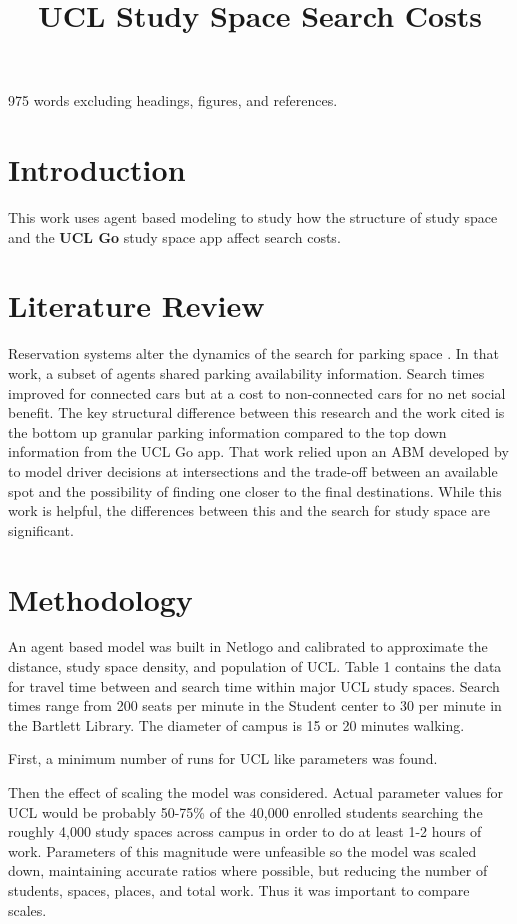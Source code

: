 \documentclass[11pt]{article} %
\title{\vspace{-2.0cm}UCL Study Space Search Costs}
\begin{document}
\maketitle

975 words excluding headings, figures, and references. \\

\section{Introduction}

This work uses agent based modeling to study how the structure of study space and the \textbf{UCL Go} study space app affect search costs.

\section{Literature Review}

Reservation systems alter the dynamics of the search for parking space \parencite{TasseronG.2017Upsr}. In that work, a subset of agents shared parking availability information. Search times improved for connected cars but  at a cost to non-connected cars for no net social benefit. The key structural difference between this research  and the work cited is the bottom up granular parking information compared to the top down information from the UCL Go app. That work relied upon an ABM developed by \cite{BenensonItzhak2008PAam} to model driver decisions at intersections and the trade-off between an available spot and the possibility of finding one closer to the final destinations. While this work is helpful, the differences between this and the search for study space are significant.  

\section{Methodology}

An agent based model was built in Netlogo and calibrated to approximate the distance, study space density, and  population of UCL. Table 1 contains the data for travel time between and search time within major UCL study spaces. Search times range from 200 seats per minute in the Student center to 30 per minute in the Bartlett Library. The diameter of campus is 15 or 20 minutes walking. 

First, a minimum number of runs for UCL like parameters was found. 

Then the effect of scaling the model was considered. Actual parameter values for UCL would be probably 50-75\% of the 40,000 enrolled students searching the roughly 4,000 study spaces across campus in order to do at least 1-2 hours of work. Parameters of this magnitude were unfeasible so the model was scaled down, maintaining accurate ratios where possible, but reducing the number of students, spaces, places, and total work. Thus it was important to compare scales. 
\end{document}
